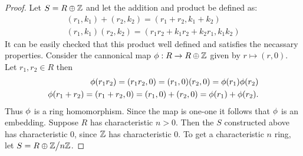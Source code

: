 \begin{proof}
  Let $S = R\oplus \mathbb{Z}$ and let the addition and product be defined as:
  \begin{align*}
    (r_1, k_1) + (r_2, k_2) = (r_1+r_2, k_1+k_2)\\
    (r_1,k_1)(r_2,k_2) = (r_1r_2 +k_1r_2 + k_2r_1, k_1 k_2) 
  \end{align*}
  It can be easily checked that this product well defined and satisfies the necassary properties. Consider the cannonical map $\phi:R\to R\oplus \mathbb{Z}$ given by $r\mapsto (r,0)$. Let $r_1, r_2\in R$ then
  \begin{align*}
    \phi(r_1r_2) = (r_1r_2,0) = (r_1, 0)(r_2,0) = \phi(r_1)\phi(r_2)\\
    \phi(r_1 + r_2) = (r_1+r_2,0) = (r_1,0) + (r_2,0) = \phi(r_1)+\phi(r_2).
  \end{align*}
  Thus $\phi$ is a ring homomorphism. Since the map is one-one it follows that $\phi$ is an embedding. Suppose $R$ has characteristic $n>0$. Then the $S$ constructed above has characteristic $0$, since $\mathbb{Z}$ has characteristic $0$. To get a characteristic $n$ ring, let $S = R\oplus \Z\bign/n\Z$.
\end{proof}
